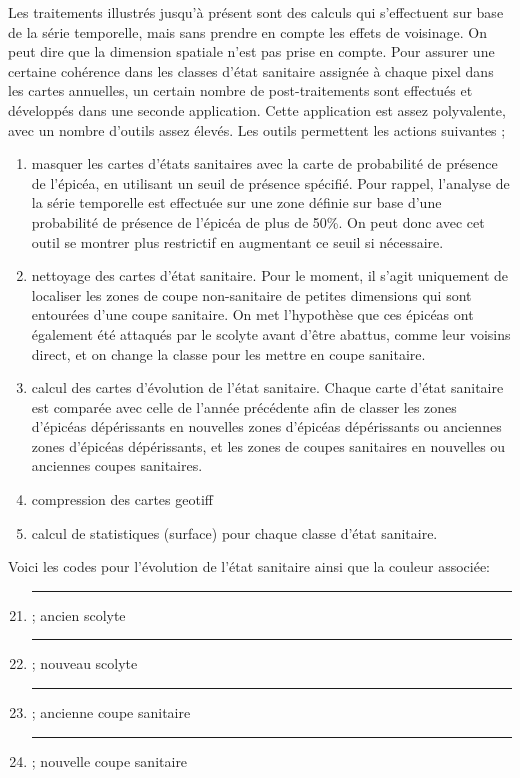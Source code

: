 \documentclass[a4paper, 12pt]{article} %
\newcommand\crule[3][black]{\textcolor{#1}{\rule{#2}{#3}}}
\begin{document}
Les traitements illustrés jusqu'à présent sont des calculs qui s'effectuent sur base de la série temporelle, mais sans prendre en compte les effets de voisinage. On peut dire que la dimension spatiale n'est pas prise en compte. Pour assurer une certaine cohérence dans les classes d'état sanitaire assignée à chaque pixel dans les cartes annuelles, un certain nombre de post-traitements sont effectués et développés dans une seconde application. Cette application est assez polyvalente, avec un nombre d'outils assez élevés. Les outils permettent les actions suivantes ;
\begin{enumerate}\addtocounter{enumi}{-1}
	
	\item masquer les cartes d'états sanitaires avec la carte de probabilité de présence de l'épicéa, en utilisant un seuil de présence spécifié. Pour rappel, l'analyse de la série temporelle est effectuée sur une zone définie sur base d'une probabilité de présence de l'épicéa de plus de 50\%. On peut donc avec cet outil se montrer plus restrictif en augmentant ce seuil si nécessaire. 
	\item nettoyage des cartes d'état sanitaire. Pour le moment, il s'agit uniquement de localiser les zones de coupe non-sanitaire de petites dimensions qui sont entourées d'une coupe sanitaire. On met l'hypothèse que ces épicéas ont également été attaqués par le scolyte avant d'être abattus, comme leur voisins direct, et on change la classe pour les mettre en coupe sanitaire.
	\item calcul des cartes d'évolution de l'état sanitaire. Chaque carte d'état sanitaire est comparée avec celle de l'année précédente afin de classer les zones d'épicéas dépérissants en nouvelles zones d'épicéas dépérissants ou anciennes zones d'épicéas dépérissants, et les zones de coupes sanitaires en nouvelles ou anciennes coupes sanitaires.
	\item  compression des cartes geotiff
	\item calcul de statistiques (surface) pour chaque classe d'état sanitaire.
\end{enumerate}

Voici les codes pour l'évolution de l'état sanitaire ainsi que la couleur associée:
\begin{enumerate}\setcounter{enumi}{20}
	\item \crule[cl21]{1cm}{1cm} ; ancien scolyte
	\item \crule[cl22]{1cm}{1cm} ; nouveau scolyte
	\setcounter{enumi}{40}
	\item \crule[cl41]{1cm}{1cm} ; ancienne coupe sanitaire
	\item \crule[cl42]{1cm}{1cm} ; nouvelle coupe sanitaire
\end{enumerate} 
\end{document}
